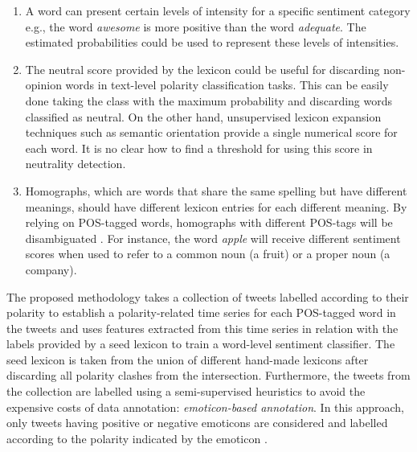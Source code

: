 \documentclass{sig-alternate}
\begin{document}
\begin{enumerate}
\item A word can present certain levels of intensity \cite{ThelwallBP12} for a specific sentiment category e.g., the word \emph{awesome} is more positive than the word \emph{adequate}. The estimated probabilities could be used to represent these levels of intensities.

\item  The neutral score provided by the lexicon could be useful for discarding non-opinion words in text-level polarity classification tasks. This can be easily done  taking the class with the maximum probability and discarding words classified as neutral. On the other hand, unsupervised lexicon expansion techniques such as semantic orientation \cite{Turney2002} provide a single numerical score for each word. It is no clear how to find a threshold for using this score in neutrality detection. 

\item   Homographs, which are  words that share the same spelling but have different meanings, should  have different lexicon entries for each different meaning. By relying on POS-tagged words, homographs with different POS-tags will be disambiguated \cite{wilks1998grammar}. For instance, the word \emph{apple}  will receive different sentiment scores when used to refer to a common noun (a fruit) or a proper noun (a company). 

\end{enumerate}


The proposed methodology takes a collection of tweets labelled according to their polarity to establish a polarity-related time series for each POS-tagged word in the tweets and uses features extracted from this time series in relation with the labels provided by a seed lexicon to train a word-level sentiment classifier. The seed lexicon is taken from the union of different hand-made lexicons after discarding all polarity clashes from the intersection. Furthermore, the tweets from the collection are labelled using a semi-supervised heuristics to avoid the expensive costs of data annotation: \emph{emoticon-based annotation}. In this approach, only tweets having positive or negative emoticons are considered and labelled according to the polarity indicated by the emoticon \cite{go2010}. 
\end{document}

